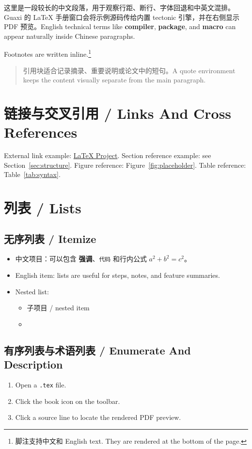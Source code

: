 \documentclass[11pt]{article}
\newcommand{\term}[1]{\textbf{\textcolor{GuaxiBlue}{#1}}}
\newcommand{\tagpill}[1]{\fbox{\textsf{\small #1}}}
\begin{document}
这里是一段较长的中文段落，用于观察行距、断行、字体回退和中英文混排。
Guaxi 的 LaTeX 手册窗口会将示例源码传给内置 tectonic 引擎，并在右侧显示
PDF 预览。English technical terms like \term{compiler}, \term{package}, and
\term{macro} can appear naturally inside Chinese paragraphs.

Footnotes are written inline.\footnote{脚注支持中文和 English text. They are
rendered at the bottom of the page.}

\begin{quote}
引用块适合记录摘录、重要说明或论文中的短句。A quote environment keeps the
content visually separate from the main paragraph.
\end{quote}

\section{链接与交叉引用 / Links And Cross References}

External link example: \href{https://www.latex-project.org/}{LaTeX Project}.
Section reference example: see Section~\ref{sec:structure}. Figure reference:
Figure~\ref{fig:placeholder}. Table reference: Table~\ref{tab:syntax}.

\section{列表 / Lists}

\subsection{无序列表 / Itemize}
\begin{itemize}
  \item 中文项目：可以包含 \textbf{强调}、\texttt{代码} 和行内公式 \(a^2+b^2=c^2\)。
  \item English item: lists are useful for steps, notes, and feature summaries.
  \item Nested list:
    \begin{itemize}
      \item 子项目 / nested item
      \item \tagpill{draft} \tagpill{review} \tagpill{final}
    \end{itemize}
\end{itemize}

\subsection{有序列表与术语列表 / Enumerate And Description}
\begin{enumerate}
  \item Open a \texttt{.tex} file.
  \item Click the book icon on the toolbar.
  \item Click a source line to locate the rendered PDF preview.
\end{enumerate}
\end{document}
